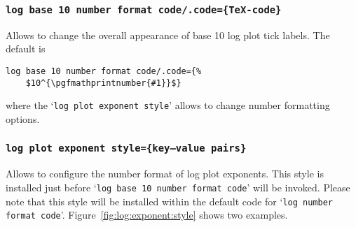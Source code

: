\subsubsection{\texttt{log base 10 number format code/.code=\{\TeX-code\}}}
Allows to change the overall appearance of base 10 log plot tick labels. The default is
\begin{lstlisting}
log base 10 number format code/.code={%
	$10^{\pgfmathprintnumber{#1}}$}
\end{lstlisting}
where the `\texttt{log plot exponent style}' allows to change number formatting options.

\subsubsection{\texttt{log plot exponent style=\{key--value pairs\}}}
Allows to configure the number format of log plot exponents. This style is installed just before `\texttt{log base 10 number format code}' will be invoked. Please note that this style will be installed within the default code for `\texttt{log number format code}'. Figure~\ref{fig:log:exponent:style} shows two examples.
